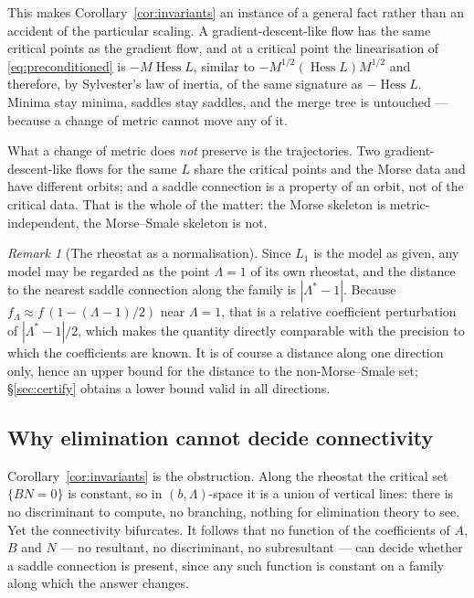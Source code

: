\documentclass[11pt]{article}
\theoremstyle{plain}
\theoremstyle{definition}
\theoremstyle{remark}
\newtheorem{remark}[theorem]{Remark}
\begin{document}
This makes Corollary~\ref{cor:invariants} an instance of a general fact rather
than an accident of the particular scaling. A gradient-descent-like flow has
the same critical points as the gradient flow, and at a critical point the
linearisation of \eqref{eq:preconditioned} is $-M\operatorname{Hess}L$, similar
to $-M^{1/2}(\operatorname{Hess}L)M^{1/2}$ and therefore, by Sylvester's law of
inertia, of the same signature as $-\operatorname{Hess}L$. Minima stay minima,
saddles stay saddles, and the merge tree is untouched --- because a change of
metric cannot move any of it.

What a change of metric does \emph{not} preserve is the trajectories. Two
gradient-descent-like flows for the same $L$ share the critical points and the
Morse data and have different orbits; and a saddle connection is a property of
an orbit, not of the critical data. That is the whole of the matter: the Morse
skeleton is metric-independent, the Morse--Smale skeleton is not.

\begin{remark}[The rheostat as a normalisation]
Since $L_1$ is the model as given, any model may be regarded as the point
$\Lambda = 1$ of its own rheostat, and the distance to the nearest saddle
connection along the family is $|\Lambda^* - 1|$. Because $f_\Lambda \approx
f\,(1 - (\Lambda-1)/2)$ near $\Lambda = 1$, that is a relative coefficient
perturbation of $|\Lambda^*-1|/2$, which makes the quantity directly comparable
with the precision to which the coefficients are known. It is of course a
distance along one direction only, hence an upper bound for the distance to the
non-Morse--Smale set; \S\ref{sec:certify} obtains a lower bound valid in all
directions.
\end{remark}

\subsection*{Why elimination cannot decide connectivity}

Corollary~\ref{cor:invariants} is the obstruction. Along the rheostat the
critical set $\{BN = 0\}$ is constant, so in $(b,\Lambda)$-space it is a union
of vertical lines: there is no discriminant to compute, no branching, nothing
for elimination theory to see. Yet the connectivity bifurcates. It follows that
no function of the coefficients of $A$, $B$ and $N$ --- no resultant, no
discriminant, no subresultant --- can decide whether a saddle connection is
present, since any such function is constant on a family along which the answer
changes.
\end{document}
